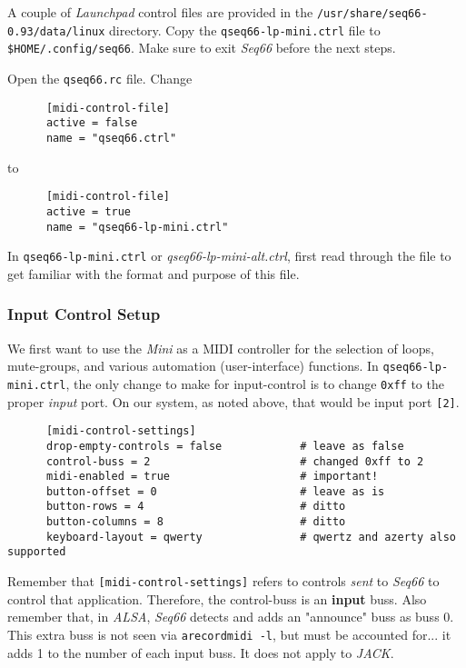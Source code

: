    A couple of \textsl{Launchpad} control files are provided in the
   \texttt{/usr/share/seq66-0.93/data/linux} directory.
   Copy the \texttt{qseq66-lp-mini.ctrl} file to
   \texttt{\$HOME/.config/seq66}.
   Make sure to exit \textsl{Seq66} before the next steps.

   Open the \texttt{qseq66.rc} file.  Change

   \begin{verbatim}
      [midi-control-file]
      active = false
      name = "qseq66.ctrl"
   \end{verbatim}

   to

   \begin{verbatim}
      [midi-control-file]
      active = true
      name = "qseq66-lp-mini.ctrl"
   \end{verbatim}

   In \texttt{qseq66-lp-mini.ctrl} or
   \textsl{qseq66-lp-mini-alt.ctrl},
   first read through the file to get familiar
   with the format and purpose of this file.

\subsubsection{Input Control Setup}
\label{subsubsec:launchpad_mini_input_control_setup}

   We first want to use the \textsl{Mini} as a MIDI controller for
   the selection of loops, mute-groups, and various automation (user-interface)
   functions.
   In \texttt{qseq66-lp-mini.ctrl},
   the only change to make for input-control is
   to change \texttt{0xff} to the proper \textsl{input} port.  On our system,
   as noted above, that would be input port \texttt{[2]}.

   \begin{verbatim}
      [midi-control-settings]
      drop-empty-controls = false            # leave as false
      control-buss = 2                       # changed 0xff to 2
      midi-enabled = true                    # important!
      button-offset = 0                      # leave as is
      button-rows = 4                        # ditto
      button-columns = 8                     # ditto
      keyboard-layout = qwerty               # qwertz and azerty also supported
   \end{verbatim}

   Remember that \texttt{[midi-control-settings]} refers to controls
   \textsl{sent} to \textsl{Seq66} to control that application.
   Therefore, the control-buss is an \textbf{input} buss.
   Also remember that, in \textsl{ALSA}, \textsl{Seq66} detects and adds an
   "announce" buss as buss 0.  This extra buss is not seen via
   \texttt{arecordmidi -l}, but must be accounted for... it adds 1 to the
   number of each input buss. It does not apply to \textsl{JACK}.

